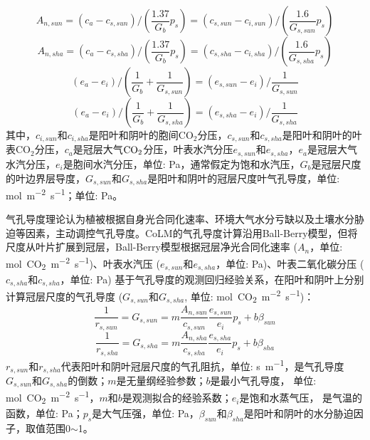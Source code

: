 \begin{equation}\label{A_n2_sun}
A_{n,sun}=\left(c_{a}-c_{s,sun}\right) /\left(\frac{1.37}{G_{b}} p_{s}\right)=\left(c_{s,sun}-c_{i,sun}\right) /\left(\frac{1.6}{G_{s,sun}} p_{s}\right)
\end{equation}
\begin{equation}\label{A_n2_sha}
A_{n,sha}=\left(c_{a}-c_{s,sha}\right) /\left(\frac{1.37}{G_{b}} p_{s}\right)=\left(c_{s,sha}-c_{i,sha}\right) /\left(\frac{1.6}{G_{s,sha}} p_{s}\right)
\end{equation}
\begin{equation}\label{ea_ei_sun}
\left(e_{a}-e_{i}\right) /\left(\frac{1}{G_{b}}+\frac{1}{G_{s,sun}}\right)=\left(e_{s,sun}-e_{i}\right) / \frac{1}{G_{s,sun}}
\end{equation}
\begin{equation}\label{ea_ei_sha}
\left(e_{a}-e_{i}\right) /\left(\frac{1}{G_{b}}+\frac{1}{G_{s,sha}}\right)=\left(e_{s,sha}-e_{i}\right) / \frac{1}{G_{s,sha}}
\end{equation}
其中，$c_{i,sun}$和$c_{i,sha}$是阳叶和阴叶的胞间CO$_2$分压，$c_{s,sun}$和$c_{s,sha}$是阳叶和阴叶的叶表CO$_2$分压，$c_a$是冠层大气$\rm CO_2$分压，叶表水汽分压$e_{s,sun}$和$e_{s,sha}$，$e_a$是冠层大气水汽分压，$e_i$是胞间水汽分压，单位: Pa，通常假定为饱和水汽压，$G_b$是冠层尺度的叶边界层导度，$G_{s,sun}$和$G_{s,sha}$是阳叶和阴叶的冠层尺度叶气孔导度，单位: \unit{mol.m^{-2}.s^{-1}}；单位: Pa。

气孔导度理论认为植被根据自身光合同化速率、环境大气水分亏缺以及土壤水分胁迫等因素，主动调控气孔导度。CoLM的气孔导度计算沿用Ball-Berry模型，但将尺度从叶片扩展到冠层，Ball-Berry模型根据冠层净光合同化速率 
($A_n$，单位: \unit{mol.CO_2.m^{-2}.s^{-1}})、叶表水汽压 ($e_{s,sun}$和$e_{s,sha}$，单位: Pa)、叶表二氧化碳分压 ($c_{s,sha}$和$c_{s,sha}$，单位: Pa) 
基于气孔导度的观测回归经验关系，在阳叶和阴叶上分别计算冠层尺度的气孔导度 ($G_{s,sun}$和$G_{s,sha}$, 单位: \unit{mol.CO_2.m^{-2}.s^{-1}})： 
\begin{equation}\label{rs_a1sun}
\frac{1}{r_{s,sun}}=G_{s,sun}=m \frac{A_{n,sun}}{c_{s,sun}} \frac{e_{s,sun}}{e_{i}} p_{s}+b\beta_{sun}
\end{equation}
\begin{equation}\label{rs_a1sha}
\frac{1}{r_{s,sha}}=G_{s,sha}=m \frac{A_{n,sha}}{c_{s,sha}} \frac{e_{s,sha}}{e_{i}} p_{s}+b\beta_{sha}
\end{equation}
$r_{s,sun}$和$r_{s,sha}$代表阳叶和阴叶冠层尺度的气孔阻抗，单位: \unit{s.m^{-1}}，是气孔导度$G_{s,sun}$和$G_{s,sha}$的倒数；$m$是无量纲经验参数；$b$是最小气孔导度，
单位: \unit{mol.CO_2.m^{-2}.s^{-1}}，$m$和$b$是观测拟合的经验系数；$e_i$是饱和水蒸气压，
是气温的函数，单位: Pa；$p_s$是大气压强，单位: Pa，$\beta_{sun}$和$\beta_{sha}$是阳叶和阴叶的水分胁迫因子，取值范围0$\sim$1。


